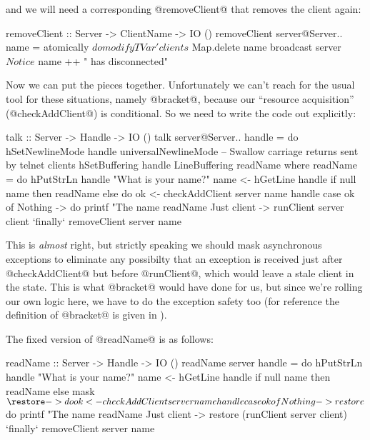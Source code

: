 \noindent and we will need a corresponding @removeClient@ that removes
the client again:

\begin{haskell}
removeClient :: Server -> ClientName -> IO ()
removeClient server@Server{..} name = atomically $ do
    modifyTVar' clients $ Map.delete name
    broadcast server $ Notice $ name ++ " has disconnected"
\end{haskell}

Now we can put the pieces together.  Unfortunately we can't reach for
the usual tool for these situations, namely @bracket@, because our
``resource acquisition'' (@checkAddClient@) is conditional.  So we
need to write the code out explicitly:

\begin{haskell}
talk :: Server -> Handle -> IO ()
talk server@Server{..} handle = do
    hSetNewlineMode handle universalNewlineMode
        -- Swallow carriage returns sent by telnet clients
    hSetBuffering handle LineBuffering
    readName
  where
    readName = do
      hPutStrLn handle "What is your name?"
      name <- hGetLine handle
      if null name
         then readName
         else do
                ok <- checkAddClient server name handle
                case ok of
                  Nothing -> do
                     printf "The name %
                     readName
                  Just client ->
                     runClient server client
                       `finally` removeClient server name
\end{haskell}

This is \emph{almost} right, but strictly speaking we should mask
asynchronous exceptions to eliminate any possibilty that an exception
is received just after @checkAddClient@ but before @runClient@, which
would leave a stale client in the state.  This is what @bracket@ would
have done for us, but since we're rolling our own logic here, we have
to do the exception safety too (for reference the definition of
@bracket@ is given in ).

The fixed version of @readName@ is as follows:

\begin{haskell}
    readName :: Server -> Handle -> IO ()
    readName server handle = do
      hPutStrLn handle "What is your name?"
      name <- hGetLine handle
      if null name
         then readName
         else mask $ \restore -> do
                ok <- checkAddClient server name handle
                case ok of
                  Nothing -> restore $ do
                     printf "The name %
                     readName
                  Just client ->
                     restore (runClient server client)
                       `finally` removeClient server name
\end{haskell}


